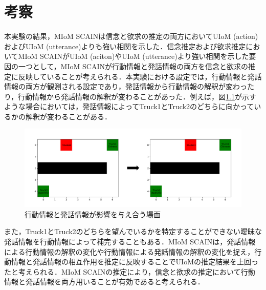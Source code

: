 \chapter{考察}
\par
本実験の結果，MIoM SCAINは信念と欲求の推定の両方においてUIoM (action)およびUIoM (utterance)よりも強い相関を示した．信念推定および欲求推定においてMIoM SCAINがUIoM (aciton)やUIoM (utterance)より強い相関を示した要因の一つとして，MIoM SCAINが行動情報と発話情報の両方を信念と欲求の推定に反映していることが考えられる．本実験における設定では，行動情報と発話情報の両方が観測される設定であり，発話情報から行動情報の解釈が変わったり，行動情報から発話情報の解釈が変わることがあった．例えば，図\ref{fig:ex_env2}が示すような場合においては，発話情報によってTruck1とTruck2のどちらに向かっているかの解釈が変わることがある．
\begin{figure}[htbp]
  \begin{center}
    \includegraphics[scale=0.48]{./ex_env2.pdf}
    \caption{行動情報と発話情報が影響を与え合う場面}
    \label{fig:ex_env2}
  \end{center}
\end{figure}
また，Truck1とTruck2のどちらを望んでいるかを特定することができない曖昧な発話情報を行動情報によって補完することもある．MIoM SCAINは，発話情報による行動情報の解釈の変化や行動情報による発話情報の解釈の変化を捉え，行動情報と発話情報の相互作用を推定に反映することでUIoMの推定結果を上回ったと考えられる．MIoM SCAINの推定により，信念と欲求の推定において行動情報と発話情報を両方用いることが有効であると考えられる．

